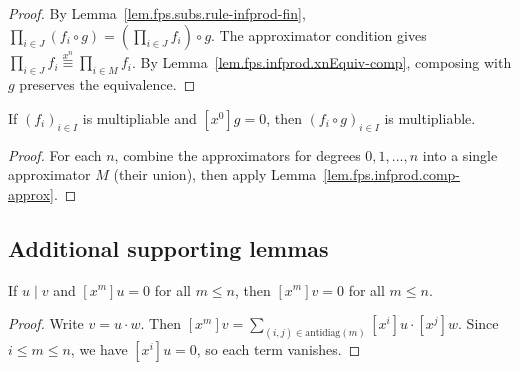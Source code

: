 \begin{proof}
\leanok
By Lemma~\ref{lem.fps.subs.rule-infprod-fin}, $\prod_{i \in J} (f_i \circ g) = (\prod_{i \in J} f_i) \circ g$.
The approximator condition gives $\prod_{i \in J} f_i \overset{x^n}{\equiv} \prod_{i \in M} f_i$.
By Lemma~\ref{lem.fps.infprod.xnEquiv-comp}, composing with $g$ preserves the equivalence.
\end{proof}

\begin{proposition}
\label{prop.fps.subs.rule-infprod-mulable}
\leanhelper
\leanok
If $(f_i)_{i \in I}$ is multipliable and $[x^0]g = 0$, then $(f_i \circ g)_{i \in I}$
is multipliable.
\end{proposition}

\begin{proof}
\leanok
For each $n$, combine the approximators for degrees $0, 1, \ldots, n$ into a single
approximator $M$ (their union), then apply Lemma~\ref{lem.fps.infprod.comp-approx}.
\end{proof}

\subsection{Additional supporting lemmas}

\begin{lemma}
\label{lem.fps.prod.irlv.mul-dvd}
\leanhelper
\leanok
If $u \mid v$ and $[x^m] u = 0$ for all $m \leq n$, then $[x^m] v = 0$ for all $m \leq n$.
\end{lemma}

\begin{proof}
\leanok
Write $v = u \cdot w$. Then $[x^m] v = \sum_{(i,j) \in \mathrm{antidiag}(m)} [x^i] u \cdot [x^j] w$.
Since $i \leq m \leq n$, we have $[x^i] u = 0$, so each term vanishes.
\end{proof}
